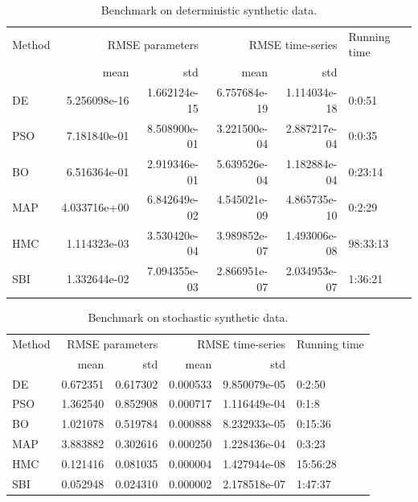 \documentclass[preprint,11pt,authoryear]{elsarticle}
\begin{document}
\clearpage

\begin{table}[p]
    \centering
    \begin{tabular}{lrrrrl}
    {Method} & \multicolumn{2}{r}{RMSE parameters} & \multicolumn{2}{r}{RMSE time-series} & Running time \\
    {} &            mean &           std &             mean & std \\
    \midrule
    DE     &    5.256098e-16 &  1.662124e-15 &     6.757684e-19 &  1.114034e-18 &       0:0:51 \\
    PSO    &    7.181840e-01 &  8.508900e-01 &     3.221500e-04 &  2.887217e-04 &       0:0:35 \\
    BO     &    6.516364e-01 &  2.919346e-01 &     5.639526e-04 &  1.182884e-04 &      0:23:14 \\
    MAP    &    4.033716e+00 &  6.842649e-02 &     4.545021e-09 &  4.865735e-10 &       0:2:29 \\
    HMC    &    1.114323e-03 &  3.530420e-04 &     3.989852e-07 &  1.493006e-08 &     98:33:13 \\
    SBI    &    1.332644e-02 &  7.094355e-03 &     2.866951e-07 &  2.034953e-07 &      1:36:21 \\
    \end{tabular}
\caption{Benchmark on deterministic synthetic data.}
\label{tab:ODEdata}
\end{table}




\begin{table}[p]
    \centering
    \begin{tabular}{lrrrrl}
    {Method} & \multicolumn{2}{r}{RMSE parameters} & \multicolumn{2}{r}{RMSE time-series} & Running time \\
    {} &            mean &       std &             mean & std \\
    \midrule
    DE     &        0.672351 &  0.617302 &         0.000533 &  9.850079e-05 &       0:2:50 \\
    PSO    &        1.362540 &  0.852908 &         0.000717 &  1.116449e-04 &        0:1:8 \\
    BO     &        1.021078 &  0.519784 &         0.000888 &  8.232933e-05 &      0:15:36 \\
    MAP    &        3.883882 &  0.302616 &         0.000250 &  1.228436e-04 &       0:3:23 \\
    HMC    &        0.121416 &  0.081035 &         0.000004 &  1.427944e-08 &     15:56:28 \\
    SBI    &        0.052948 &  0.024310 &         0.000002 &  2.178518e-07 &      1:47:37 \\
\end{tabular}
\caption{Benchmark on stochastic synthetic data.}
\label{tab:SDEdata}
\end{table}
\end{document}
